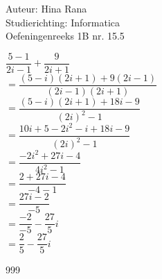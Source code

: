 \documentclass[a4paper]{article}
\begin{document}
\noindent \large Auteur: Hina Rana \\
\noindent \large Studierichting: Informatica\\
\noindent \large Oefeningenreeks 1B nr. 15.5\\

\medskip

\normalsize

$\dfrac{5-1}{2i-1} + \dfrac{9}{2i+1}$\\

$ = \dfrac{(5-i)(2i+1)+9(2i-1)}{(2i-1)(2i+1)}$\\

$ = \dfrac{(5-i)(2i+1) + 18i - 9}{(2i)^2 - 1}$\\

$ = \dfrac{10i+5-2i^2 -i +18i -9}{(2i)^2 -1}$\\

$ = \dfrac{-2i^2 +27i -4}{4i^2 -1}$\\

$ = \dfrac{2+27i-4}{-4-1}$\\

$ = \dfrac{27i-2}{-5}$\\

$ = \dfrac{-2}{-5}-\dfrac{27}{5}i$\\

$ = \dfrac{2}{5} - \dfrac{27}{5}i$\\


\begin{thebibliography}{999}
\end{thebibliography}
\end{document}
